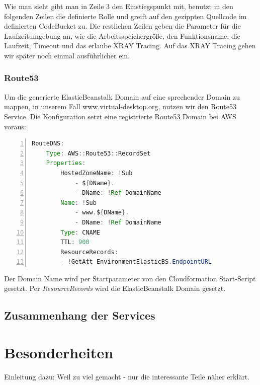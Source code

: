 \documentclass[a4paper, 12pt]{scrreprt}
\renewcommand\_{\textunderscore\allowbreak}
\begin{document}
Wie man sieht gibt man in Zeile 3 den Einstiegspunkt mit, benutzt in den folgenden Zeilen die definierte Rolle und greift auf den gezippten Quellcode im definierten CodeBucket zu. Die restlichen Zeilen geben die Parameter für die Laufzeitumgebung an, wie die Arbeitsspeichergröße, den Funktionsname, die Laufzeit, Timeout und das erlaube XRAY Tracing. Auf das XRAY Tracing gehen wir später noch einmal ausführlicher ein.

\subsection{Route53}
Um die generierte ElasticBeanstalk Domain auf eine sprechender Domain zu mappen, in unserem Fall www.virtual-desktop.org, nutzen wir den Route53 Service. Die Konfiguration setzt eine registrierte Route53 Domain bei AWS voraus:

\begin{lstlisting}[xleftmargin=\parindent,numbers=left,numberstyle=\small,numbersep=8pt,frame=L,mathescape=true, basicstyle=\small, language=Java, lineskip={1.0pt}]
RouteDNS:
    Type: AWS::Route53::RecordSet
    Properties:
        HostedZoneName: !Sub
            - ${DName}.
            - DName: !Ref DomainName
        Name: !Sub
            - www.${DName}.
            - DName: !Ref DomainName
        Type: CNAME
        TTL: 900
        ResourceRecords:
        - !GetAtt EnvironmentElasticBS.EndpointURL
\end{lstlisting}

Der Domain Name wird per Startparameter von den Cloudformation Start-Script gesetzt. Per \textit{ResourceRecords} wird die ElasticBeanstalk Domain gesetzt.
 
\section{Zusammenhang der Services}
%













\chapter{Besonderheiten}
Einleitung dazu: Weil zu viel gemacht - nur die interessante Teile näher erklärt.
\end{document}
